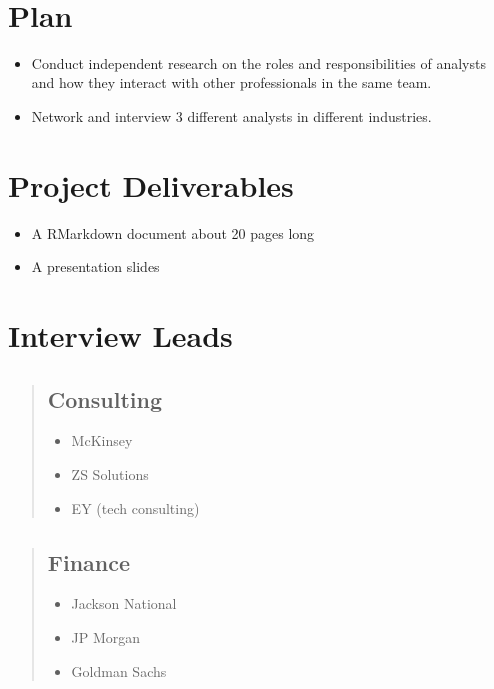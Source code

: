 \documentclass[
]{book}
\providecommand{\tightlist}{%
  \setlength{\itemsep}{0pt}\setlength{\parskip}{0pt}}
\begin{document}
~

\hypertarget{plan}{%
\section{\texorpdfstring{\textbf{Plan}}{Plan}}\label{plan}}

\begin{itemize}
\tightlist
\item
  Conduct independent research on the roles and responsibilities of analysts and how they interact with other professionals in the same team.
\item
  Network and interview 3 different analysts in different industries.
\end{itemize}

\hypertarget{project-deliverables}{%
\section{\texorpdfstring{\textbf{Project Deliverables}}{Project Deliverables}}\label{project-deliverables}}

\begin{itemize}
\tightlist
\item
  A RMarkdown document about 20 pages long
\item
  A presentation slides
\end{itemize}

\hypertarget{interview-leads}{%
\section{\texorpdfstring{\textbf{Interview Leads}}{Interview Leads}}\label{interview-leads}}

\begin{quote}
\hypertarget{consulting}{%
\subsection{\texorpdfstring{\textbf{Consulting}}{Consulting}}\label{consulting}}

\begin{itemize}
\tightlist
\item
  McKinsey
\item
  ZS Solutions
\item
  EY (tech consulting)
\end{itemize}
\end{quote}

\begin{quote}
\hypertarget{finance}{%
\subsection{\texorpdfstring{\textbf{Finance}}{Finance}}\label{finance}}

\begin{itemize}
\tightlist
\item
  Jackson National
\item
  JP Morgan
\item
  Goldman Sachs
\end{itemize}
\end{quote}
\end{document}
